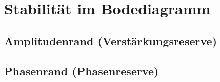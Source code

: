\section{Stabilität im Bodediagramm}

\subsection{Amplitudenrand (Verstärkungsreserve)}


\subsection{Phasenrand (Phasenreserve)}


